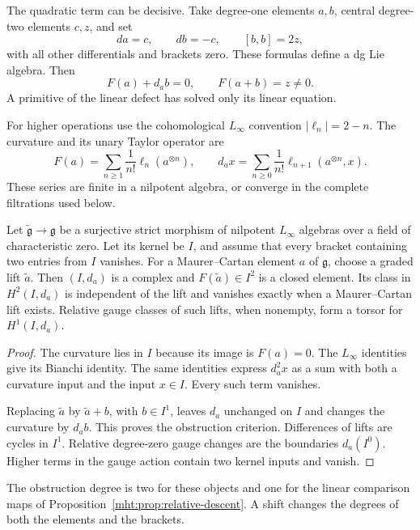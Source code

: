 The quadratic term can be decisive. Take degree-one elements $a,b$,
central degree-two elements $c,z$, and set
\[
 da=c,\qquad db=-c,\qquad [b,b]=2z,
\]
with all other differentials and brackets zero. These formulas
define a dg Lie algebra. Then
\[
 F(a)+d_ab=0,\qquad F(a+b)=z\ne0.
\]
A primitive of the linear defect has solved only its linear
equation.

For higher operations use the cohomological $L_\infty$ convention
$|\ell_n|=2-n$. The curvature and its unary Taylor operator are
\[
 F(a)=\sum_{n\geq1}\frac1{n!}\ell_n(a^{\otimes n}),\qquad
 d_a x=\sum_{n\geq0}\frac1{n!}\ell_{n+1}(a^{\otimes n},x).
\]
These series are finite in a nilpotent algebra, or converge in the
complete filtrations used below.

\begin{proposition}\label{mht:prop:square-zero-descent}
Let $\widetilde{\mathfrak g}\to\mathfrak g$ be a surjective strict
morphism of nilpotent $L_\infty$ algebras over a field of
characteristic zero. Let its kernel be $I$, and assume that every
bracket containing two entries from $I$ vanishes. For a
Maurer--Cartan element $a$ of $\mathfrak g$, choose a graded lift
$\widetilde a$. Then $(I,d_a)$ is a complex and
$F(\widetilde a)\in I^2$ is a closed element. Its class in
$H^2(I,d_a)$ is independent of the lift and vanishes exactly when
a Maurer--Cartan lift exists. Relative gauge classes of such lifts,
when nonempty, form a torsor for $H^1(I,d_a)$.
\end{proposition}

\begin{proof}
The curvature lies in $I$ because its image is $F(a)=0$.
The $L_\infty$ identities give its Bianchi identity. The same
identities express $d_a^2x$ as a sum with both a curvature input
and the input $x\in I$. Every such term vanishes.

Replacing
$\widetilde a$ by $\widetilde a+b$, with $b\in I^1$, leaves $d_a$
unchanged on $I$ and changes the curvature by $d_ab$.
This proves
the obstruction criterion. Differences of lifts are cycles in
$I^1$. Relative degree-zero gauge changes are the boundaries
$d_a(I^0)$. Higher terms in the gauge action contain two kernel
inputs and vanish.
\end{proof}

The obstruction degree is two for these objects and one for the
linear comparison maps of Proposition~\ref{mht:prop:relative-descent}.
A shift changes the degrees of both the elements and the brackets.

